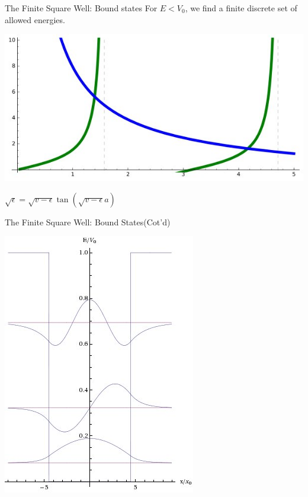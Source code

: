 \documentclass{beamer}
\begin{document}
\begin{frame}{The Finite Square Well: Bound states}
    For $E<V_0$, we find a finite discrete set of allowed energies.
    \begin{center}
    \includegraphics[scale=0.4]{transcendental_solutions}
    \end{center}
    $\sqrt{\epsilon} = \sqrt{v-\epsilon}\tan(\sqrt{v-\epsilon}a)$
\end{frame}


\begin{frame}{The Finite Square Well: Bound States(Cot'd)}
    \begin{center}
    \includegraphics[scale=0.4]{FSW_soln}
    \end{center}
\end{frame}
\end{document}

